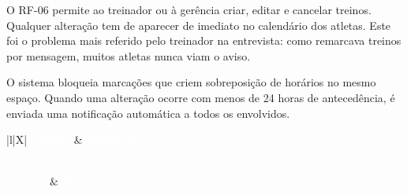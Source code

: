 O RF-06 permite ao treinador ou à gerência criar, editar e cancelar treinos. Qualquer alteração tem de aparecer de imediato no calendário dos atletas. Este foi o problema mais referido pelo treinador na entrevista: como remarcava treinos por mensagem, muitos atletas nunca viam o aviso.

O sistema bloqueia marcações que criem sobreposição de horários no mesmo espaço. Quando uma alteração ocorre com menos de 24 horas de antecedência, é enviada uma notificação automática a todos os envolvidos.

{\small
{}
\begin{xltabular}{\textwidth}{|l|X|}
\hline
{}\textcolor{white}{\textbf{Campo}} & \textcolor{white}{\textbf{Descrição}} \\ \hline
\endfirsthead

 \\
\hline
{}\textcolor{white}{\textbf{Campo}} & \textcolor{white}{\textbf{Descrição}} \\ \hline
\endhead

\hline {} \\ \hline \endfoot

\hline
\caption{Especificação do Requisito Funcional: RF-06}
\label{tab:rf-06} \\
\endlastfoot


\end{xltabular}}
